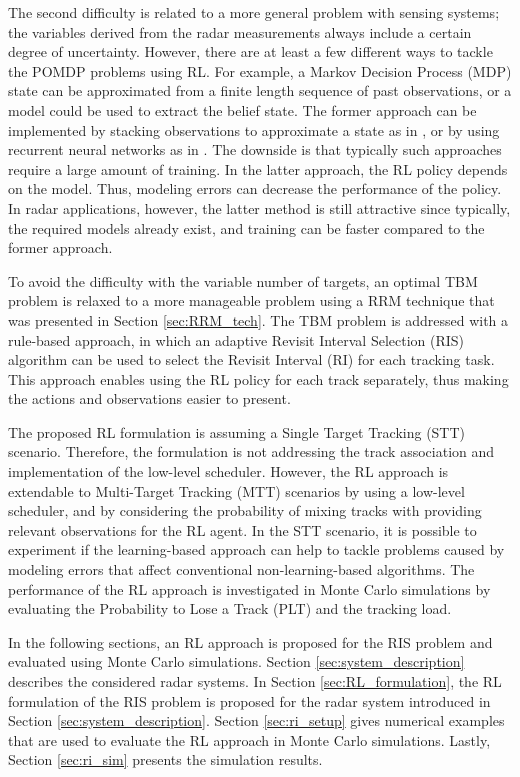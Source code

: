 \documentclass[english, 12pt, a4paper, elec, utf8, a-1b, online]{aaltothesis}
\numberwithin{equation}{section}
\begin{document}
The second difficulty is related to a more general problem with sensing systems; the variables derived from the radar measurements always include a certain degree of uncertainty.
However, there are at least a few different ways to tackle the POMDP problems using RL.
For example, a Markov Decision Process (MDP) state can be approximated from a finite length sequence of past observations, or a model could be used to extract the belief state.
The former approach can be implemented by stacking observations to approximate a state as in \cite{Mnih2013}, or by using recurrent neural networks as in \cite{Hausknecht2015}.
The downside is that typically such approaches require a large amount of training.
In the latter approach, the RL policy depends on the model.
Thus, modeling errors can decrease the performance of the policy.
In radar applications, however, the latter method is still attractive since typically, the required models already exist, and training can be faster compared to the former approach.

To avoid the difficulty with the variable number of targets, an optimal TBM problem is relaxed to a more manageable problem using a RRM technique that was presented in Section \ref{sec:RRM_tech}.
The TBM problem is addressed with a rule-based approach, in which an adaptive Revisit Interval Selection (RIS) algorithm can be used to select the Revisit Interval (RI) for each tracking task.
This approach enables using the RL policy for each track separately, thus making the actions and observations easier to present.

The proposed RL formulation is assuming a Single Target Tracking (STT) scenario. 
Therefore, the formulation is not addressing the track association and implementation of the low-level scheduler.
However, the RL approach is extendable to Multi-Target Tracking (MTT) scenarios by using a low-level scheduler, and by considering the probability of mixing tracks with providing relevant observations for the RL agent.
In the STT scenario, it is possible to experiment if the learning-based approach can help to tackle problems caused by modeling errors that affect conventional non-learning-based algorithms.
The performance of the RL approach is investigated in Monte Carlo simulations by evaluating the Probability to Lose a Track (PLT) and the tracking load.

In the following sections, an RL approach is proposed for the RIS problem and evaluated using Monte Carlo simulations.
Section \ref{sec:system_description} describes the considered radar systems.
In Section \ref{sec:RL_formulation}, the RL formulation of the RIS problem is proposed for the radar system introduced in Section \ref{sec:system_description}.
Section \ref{sec:ri_setup} gives numerical examples that are used to evaluate the RL approach in Monte Carlo simulations. 
Lastly, Section \ref{sec:ri_sim} presents the simulation results.
\end{document}
